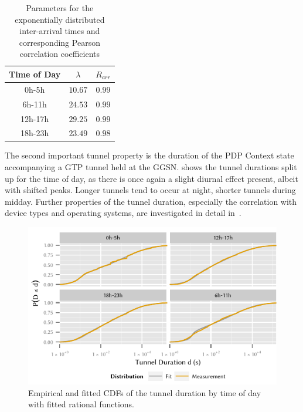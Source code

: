 \begin{table}
  \centering
  \caption{Parameters for the exponentially distributed inter-arrival times and corresponding Pearson correlation coefficients}
  \label{tab:cloud:virtualized_network_functions:measurement_data:evaluation:iat_fits}  
  \begin{tabular}{ccc}
  \toprule
  Time of Day & \(\lambda\) & \(R_{arr}\)\\
  \midrule
  0h-5h & $10.67$ & $0.99$\\
  6h-11h & $24.53$ & $0.99$\\
  12h-17h & $29.25$ & $0.99$\\
  18h-23h & $23.49$ & $0.98$\\
   \bottomrule
  \end{tabular}
\end{table}

The second important tunnel property is the duration of the \gls{PDP} Context state accompanying a \gls{GTP} tunnel held at the \gls{GGSN}.
 shows the tunnel durations split up for the time of day, as there is once again a slight diurnal effect present, albeit with shifted peaks.
Longer tunnels tend to occur at night, shorter tunnels during midday.
Further properties of the tunnel duration, especially the correlation with device types and operating systems, are investigated in detail in~\cite{Metzger2014}.

\begin{figure}
  \centering
  \includegraphics{cloud/virtualized_network_functions/measurement_data/figures/tunnel_duration}
  \caption{Empirical and fitted CDFs of the tunnel duration by time of day with fitted rational functions.}
  \label{fig:cloud:virtualized_network_functions:measurement_data:evaluation:tunnel_duration}
\end{figure}

